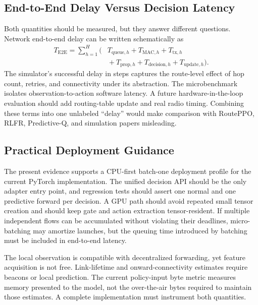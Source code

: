 \documentclass[drones,article,submit,moreauthors]{Definitions/mdpi}
\begin{document}
\subsection{End-to-End Delay Versus Decision Latency}

Both quantities should be measured, but they answer different questions. Network end-to-end delay can be written schematically as
\begin{equation}
\begin{aligned}
T_{\mathrm{E2E}}=\sum_{h=1}^{H}\big(&T_{\mathrm{queue},h}+T_{\mathrm{MAC},h}
+T_{\mathrm{tx},h}\\
&{}+T_{\mathrm{prop},h}+T_{\mathrm{decision},h}
+T_{\mathrm{update},h}\big).
\end{aligned}
\end{equation}
The simulator's successful delay in steps captures the route-level effect of hop count, retries, and connectivity under its abstraction. The microbenchmark isolates observation-to-action software latency. A future hardware-in-the-loop evaluation should add routing-table update and real radio timing. Combining these terms into one unlabeled ``delay'' would make comparison with RoutePPO, RLFR, Predictive-Q, and simulation papers misleading.

\subsection{Practical Deployment Guidance}

The present evidence supports a CPU-first batch-one deployment profile for the current PyTorch implementation. The unified decision API should be the only adapter entry point, and regression tests should assert one normal and one predictive forward per decision. A GPU path should avoid repeated small tensor creation and should keep gate and action extraction tensor-resident. If multiple independent flows can be accumulated without violating their deadlines, micro-batching may amortize launches, but the queuing time introduced by batching must be included in end-to-end latency.

The local observation is compatible with decentralized forwarding, yet feature acquisition is not free. Link-lifetime and onward-connectivity estimates require beacons or local prediction. The current policy-input byte metric measures memory presented to the model, not the over-the-air bytes required to maintain those estimates. A complete implementation must instrument both quantities.
\end{document}
